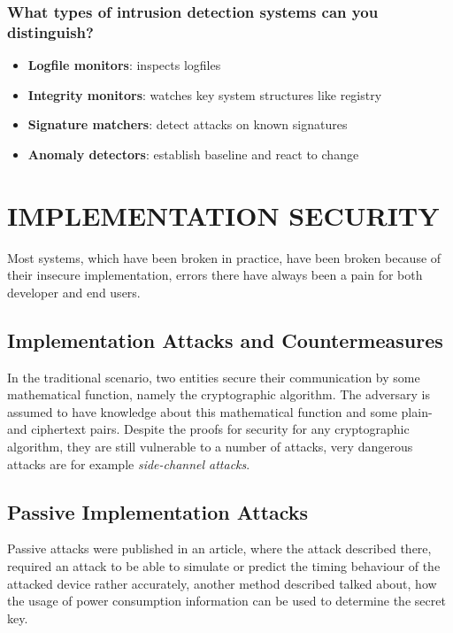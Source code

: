 \documentclass[a4paper, 10 pt, conference]{ieeeconf}
\begin{document}
\subsubsection{\textbf{What types of intrusion detection systems can you distinguish?}}
\begin{itemize}
\item \textbf{Logfile monitors}: inspects logfiles
\item \textbf{Integrity monitors}: watches key system structures like registry
\item \textbf{Signature matchers}: detect attacks on known signatures
\item \textbf{Anomaly detectors}: establish baseline and react to change
\end{itemize}




\pagebreak

\section{\textbf{IMPLEMENTATION SECURITY}}
Most systems, which have been broken in practice, have been broken because of their insecure implementation, errors there have always been a pain for both developer and end users. 
\subsection{\textbf{Implementation Attacks and Countermeasures}}
In the traditional scenario, two entities secure their communication by some mathematical function, namely the cryptographic algorithm. The adversary is assumed to have knowledge about this mathematical function and some plain- and ciphertext pairs. Despite the proofs for security for any cryptographic algorithm, they are still vulnerable to a number of attacks, very dangerous attacks are for example \emph{side-channel attacks}. \\


\subsection{\textbf{Passive Implementation Attacks}}
Passive attacks were published in an article, where the attack described there, required an attack to be able to simulate or predict the timing behaviour of the attacked device rather accurately, another method described talked about, how the usage of power consumption information can be used to determine the secret key. 
\vspace{0.5cm}
\end{document}
